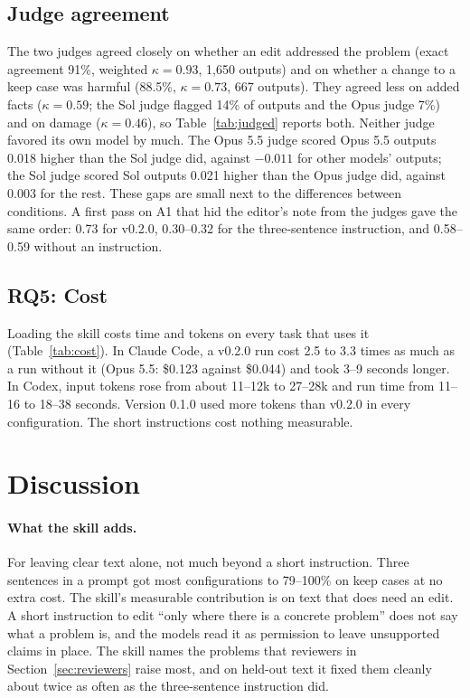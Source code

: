 \documentclass[11pt]{article}
\begin{document}
\subsection{Judge agreement}
\label{sec:judges}

The two judges agreed closely on whether an edit addressed the problem (exact agreement
91\%, weighted $\kappa=0.93$, 1{,}650 outputs) and on whether a change to a keep case was
harmful (88.5\%, $\kappa=0.73$, 667 outputs). They agreed less on added facts ($\kappa=0.59$;
the Sol judge flagged 14\% of outputs and the Opus judge 7\%) and on damage
($\kappa=0.46$), so Table~\ref{tab:judged} reports both. Neither judge favored its own
model by much. The Opus 5.5 judge scored Opus 5.5 outputs 0.018 higher than the Sol judge
did, against $-0.011$ for other models' outputs; the Sol judge scored Sol outputs 0.021
higher than the Opus judge did, against 0.003 for the rest. These gaps are small next to
the differences between conditions. A first pass on A1 that hid the editor's note from
the judges gave the same order: 0.73 for v0.2.0, 0.30--0.32 for the three-sentence
instruction, and 0.58--0.59 without an instruction.

\subsection{RQ5: Cost}

Loading the skill costs time and tokens on every task that uses it
(Table~\ref{tab:cost}). In Claude Code, a v0.2.0 run cost 2.5 to 3.3 times as much as a
run without it (Opus 5.5: \$0.123 against \$0.044) and took 3--9 seconds longer. In Codex,
input tokens rose from about 11--12k to 27--28k and run time from 11--16 to 18--38 seconds.
Version 0.1.0 used more tokens than v0.2.0 in every configuration. The short
instructions cost nothing measurable.



\section{Discussion}

\paragraph{What the skill adds.} For leaving clear text alone, not much beyond a short
instruction. Three sentences in a prompt got most configurations to 79--100\% on keep
cases at no extra cost. The skill's measurable contribution is on text that does need an
edit. A short instruction to edit ``only where there is a concrete problem'' does not say
what a problem is, and the models read it as permission to leave unsupported claims in
place. The skill names the problems that reviewers in Section~\ref{sec:reviewers} raise
most, and on held-out text it fixed them cleanly about twice as often as the
three-sentence instruction did.
\end{document}
